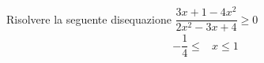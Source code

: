 	Risolvere la seguente disequazione $\dfrac{3x+1-4x^2}{2x^2-3x+4}\geq 0$
	\begin{align*}
	-\dfrac{1}{4}\leq&x\leq 1
	\end{align*}
